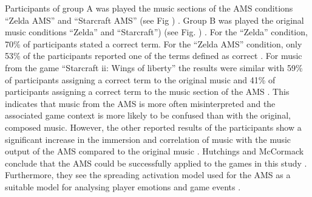 Participants of group A was played the music sections of the AMS conditions “Zelda AMS” and “Starcraft AMS” (see Fig ) \cite{hutMcCormAms}. Group B was played the original music conditions “Zelda” and “Starcraft”) (see Fig. ) \cite{hutMcCormAms}.
For the “Zelda” condition, 70\% of participants stated a correct term. For the “Zelda AMS” condition, only 53\% of the participants reported one of the terms defined as correct \cite{hutMcCormAms}.
For music from the game “Starcraft ii: Wings of liberty” the results were similar with 59\% of participants assigning a correct term to the original music and 41\% of participants assigning a correct term to the music section of the AMS \cite{hutMcCormAms}.
This indicates that music from the AMS is more often misinterpreted and the associated game context is more likely to be confused than with the original, composed music.
However, the other reported results of the participants show a significant increase in the immersion and correlation of music with the music output of the AMS compared to the original music \cite{hutMcCormAms}.
Hutchings and McCormack conclude that the AMS could be successfully applied to the games in this study \cite{hutMcCormAms}. Furthermore, they see the spreading activation model used for the AMS as a suitable model for analysing player emotions and game events \cite{hutMcCormAms}.

